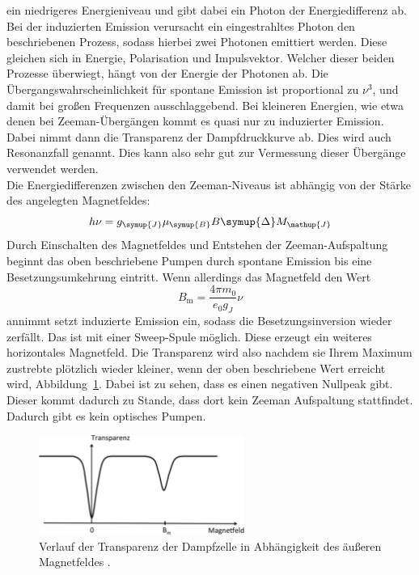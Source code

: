 \documentclass[
  bibliography=totoc,     %
  captions=tableheading,  %
  titlepage=firstiscover, %
]{scrartcl}
\begin{document}
ein niedrigeres Energieniveau und gibt dabei ein Photon der Energiedifferenz
ab. Bei der induzierten Emission verursacht ein eingestrahltes Photon
den beschriebenen Prozess, sodass hierbei zwei Photonen emittiert werden. Diese
gleichen sich in Energie, Polarisation und Impulsvektor. Welcher dieser beiden
Prozesse überwiegt, hängt von der Energie der Photonen ab. Die
Übergangswahrscheinlichkeit für spontane Emission ist proportional zu $\nu^3$,
und damit bei großen Frequenzen ausschlaggebend. Bei kleineren Energien, wie
etwa denen bei Zeeman-Übergängen kommt es quasi nur zu induzierter Emission.
Dabei nimmt dann die Transparenz der Dampfdruckkurve ab. Dies wird auch Resonanzfall
genannt.
Dies kann also sehr gut zur Vermessung dieser Übergänge verwendet werden. \\
Die Energiedifferenzen zwischen den Zeeman-Niveaus ist abhängig von der Stärke
des angelegten Magnetfeldes:
%
\begin{equation}
  h\nu=g_{\symup{J}}\mu_{\symup{B}}B\symup{\Delta}M_{\mathup{J}}
  \label{eq:übergangsenergie}
\end{equation}
%
Durch Einschalten des Magnetfeldes und Entstehen der Zeeman-Aufspaltung beginnt
das oben beschriebene Pumpen durch spontane Emission bis eine
Besetzungsumkehrung eintritt. Wenn allerdings das Magnetfeld den Wert
%
\begin{equation}
  B_{\mathup{m}}=\frac{4\pi m_0}{e_0g_J}\nu
\end{equation}
%
annimmt setzt induzierte Emission ein, sodass die Besetzungsinversion wieder
zerfällt. Das ist mit einer Sweep-Spule möglich. Diese erzeugt ein weiteres horizontales
Magnetfeld. Die Transparenz wird also nachdem sie Ihrem Maximum zustrebte plötzlich
wieder kleiner, wenn der oben beschriebene Wert erreicht wird, Abbildung~\ref{fig:transparenz_b}.
Dabei ist zu sehen, dass es einen negativen Nullpeak gibt. Dieser kommt dadurch
zu Stande, dass dort kein Zeeman Aufspaltung stattfindet. Dadurch gibt es kein
optisches Pumpen.
\begin{figure}[htb]
  \centering
  \includegraphics[width=0.6\textwidth]{transparenzkurve.pdf}
  \caption{Verlauf der Transparenz der Dampfzelle in Abhängigkeit des äußeren Magnetfeldes \cite{anleitung}.}
  \label{fig:transparenz_b}
\end{figure}
%
\end{document}
